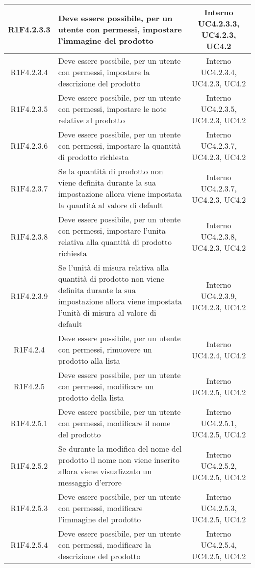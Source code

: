 \begin{longtable}{|c|>{\centering}m{7cm}|c|}
			\hline
			R1F4.2.3.3 & Deve essere possibile, per un utente con permessi, impostare l'immagine del prodotto & Interno UC4.2.3.3, UC4.2.3, UC4.2 \\
			\hline
			R1F4.2.3.4 & Deve essere possibile, per un utente con permessi, impostare la descrizione del prodotto & Interno UC4.2.3.4, UC4.2.3, UC4.2 \\
			\hline
			R1F4.2.3.5 & Deve essere possibile, per un utente con permessi, impostare le note relative al prodotto & Interno UC4.2.3.5, UC4.2.3, UC4.2 \\
			\hline
			R1F4.2.3.6 & Deve essere possibile, per un utente con permessi, impostare la quantità di prodotto richiesta & Interno UC4.2.3.7, UC4.2.3, UC4.2 \\
			\hline
			R1F4.2.3.7 & Se la quantità di prodotto non viene definita durante la sua impostazione allora viene impostata la quantità al valore di default & Interno UC4.2.3.7, UC4.2.3, UC4.2 \\
			\hline
			R1F4.2.3.8 & Deve essere possibile, per un utente con permessi, impostare l'unita relativa alla quantità di prodotto richiesta & Interno UC4.2.3.8, UC4.2.3, UC4.2 \\
			\hline
			R1F4.2.3.9 & Se l'unità di misura relativa alla quantità di prodotto non viene definita durante la sua impostazione allora viene impostata l'unità di misura al valore di default & Interno UC4.2.3.9, UC4.2.3, UC4.2 \\
			\hline
			R1F4.2.4 & Deve essere possibile, per un utente con permessi, rimuovere un prodotto alla lista & Interno UC4.2.4, UC4.2 \\
			\hline
			R1F4.2.5 & Deve essere possibile, per un utente con permessi, modificare un prodotto della lista & Interno UC4.2.5, UC4.2 \\
			\hline
			R1F4.2.5.1 & Deve essere possibile, per un utente con permessi, modificare il nome del prodotto & Interno UC4.2.5.1, UC4.2.5, UC4.2 \\
			\hline
			R1F4.2.5.2 & Se durante la modifica del nome del prodotto il nome non viene inserito allora viene visualizzato un messaggio d'errore & Interno UC4.2.5.2, UC4.2.5, UC4.2 \\
			\hline
			R1F4.2.5.3 & Deve essere possibile, per un utente con permessi, modificare l'immagine del prodotto & Interno UC4.2.5.3, UC4.2.5, UC4.2 \\
			\hline
			R1F4.2.5.4 & Deve essere possibile, per un utente con permessi, modificare la descrizione del prodotto & Interno UC4.2.5.4, UC4.2.5, UC4.2 \\

\end{longtable}
